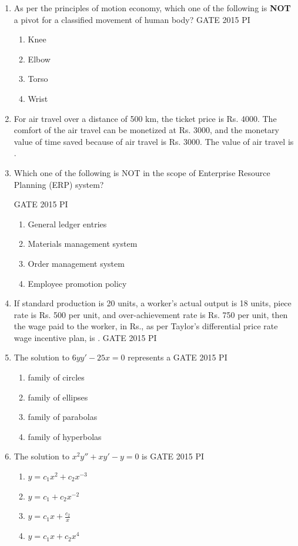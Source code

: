 \documentclass[journal,12pt,onecolumn]{IEEEtran}
\theoremstyle{remark}
\begin{document}
\begin{enumerate}
\item As per the principles of motion economy, which one of the following is \textbf{NOT} a pivot for a classified movement of human body? \hfill{GATE 2015 PI}
\begin{enumerate}
    \item Knee
    \item Elbow
    \item Torso
    \item Wrist
\end{enumerate}

\item For air travel over a distance of 500 km, the ticket price is Rs. 4000. The comfort of the air travel can be monetized at Rs. 3000, and the monetary value of time saved because of air travel is Rs. 3000. The value of air travel is \underline{\hspace{2cm}}.
\item Which one of the following is NOT in the scope of Enterprise Resource Planning (ERP) system? 

\hfill{GATE 2015 PI}
\begin{enumerate}
    \item General ledger entries
    \item Materials management system
    \item Order management system
    \item Employee promotion policy
\end{enumerate}

\item If standard production is 20 units, a worker's actual output is 18 units, piece rate is Rs. 500 per unit, and over-achievement rate is Rs. 750 per unit, then the wage paid to the worker, in Rs., as per Taylor's differential price rate wage incentive plan, is \underline{\hspace{2cm}}. \hfill{GATE 2015 PI}

\item The solution to $6yy' - 25x = 0$ represents a \hfill{GATE 2015 PI}
\begin{enumerate}
    \item family of circles
    \item family of ellipses
    \item family of parabolas
    \item family of hyperbolas
\end{enumerate}
\item The solution to $x^2 y'' + xy' - y = 0$ is \hfill{GATE 2015 PI}
\begin{enumerate}
    \item $y = c_1 x^2 + c_2 x^{-3}$
    \item $y = c_1 + c_2 x^{-2}$
    \item $y = c_1 x + \frac{c_2}{x}$
    \item $y = c_1 x + c_2 x^4$
\end{enumerate}


\end{enumerate}
\end{document}
